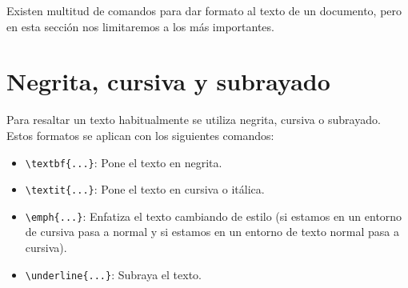 \documentclass[
  a4paper,
]{scrreport}
\providecommand{\tightlist}{%
  \setlength{\itemsep}{0pt}\setlength{\parskip}{0pt}}\usepackage{longtable,booktabs,array}
\theoremstyle{definition}
\theoremstyle{remark}
\begin{document}
Existen multitud de comandos para dar formato al texto de un documento,
pero en esta sección nos limitaremos a los más importantes.

\section{Negrita, cursiva y
subrayado}\label{negrita-cursiva-y-subrayado}

Para resaltar un texto habitualmente se utiliza negrita, cursiva o
subrayado. Estos formatos se aplican con los siguientes comandos:

\begin{itemize}
\tightlist
\item
  \texttt{\textbackslash{}textbf\{...\}}: Pone el texto en negrita.
\item
  \texttt{\textbackslash{}textit\{...\}}: Pone el texto en cursiva o
  itálica.
\item
  \texttt{\textbackslash{}emph\{...\}}: Enfatiza el texto cambiando de
  estilo (si estamos en un entorno de cursiva pasa a normal y si estamos
  en un entorno de texto normal pasa a cursiva).
\item
  \texttt{\textbackslash{}underline\{...\}}: Subraya el texto.
\end{itemize}
\end{document}
